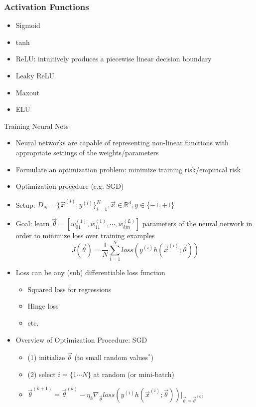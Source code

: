\documentclass[10pt, oneside]{article}
\newcommand{\R}{\mathbb{R}}
\begin{document}
\subsubsection{Activation Functions}
\begin{itemize}
    \item Sigmoid
    \item tanh
    \item ReLU: intuitively produces a piecewise linear decision boundary
    \item Leaky ReLU
    \item Maxout
    \item ELU 
\end{itemize}
Training Neural Nets
\begin{itemize}
    \item Neural networks are capable of representing non-linear functions with appropriate settings of the weights/parameters
    \item Formulate an optimization problem: minimize training risk/empirical risk
    \item Optimization procedure (e.g. SGD)
    \item Setup: $D_N = \{\vec x^{(i)}, y^{(i)}\}_{i=1}^N, \vec x \in \R^d, y\in \{-1, +1\}$
    \item Goal: learn $\vec \theta = [w_{01}^{(1)}, w_{11}^{(1)}, \cdots, w_{km}^{(L)}]$ parameters of the neural network in order to minimize loss over training examples
    \[J(\vec \theta) = \frac{1}{N} \sum_{i=1}^N loss\left(y^{(i)} h(\vec x^{(i)}; \vec \theta)\right)\]
    \item Loss can be any (sub) differentiable loss function
    \begin{itemize}
        \item Squared loss for regressions
        \item Hinge loss
        \item etc.
    \end{itemize}
    \item Overview of Optimization Procedure: SGD
    \begin{itemize}
        \item (1) initialize $\vec \theta$ (to small random values$^*$)
        \item (2) select $i=\{1 \cdots N\}$ at random (or mini-batch)
        \item $\vec \theta^{(k+1)} = \vec \theta^{(k)} - \eta_k \nabla_{\vec \theta} loss (y^{(i)} h(\vec x^{(i)}; \vec \theta)) |_{\vec \theta=\vec \theta^{(k)}}$

\end{itemize}
\end{itemize}
\end{document}
